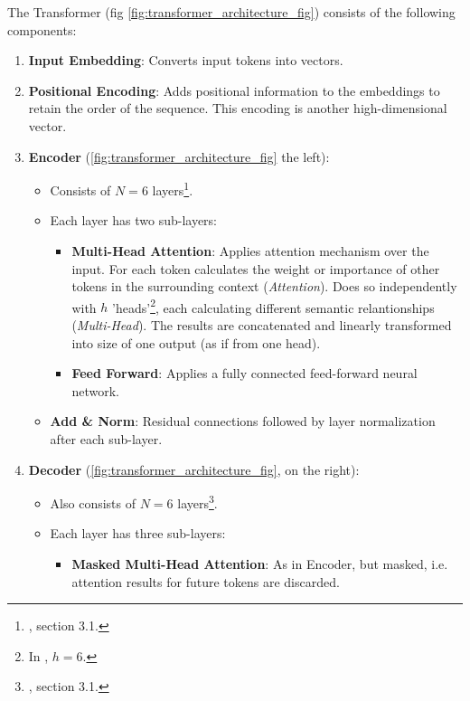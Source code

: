 The Transformer (fig \autoref{fig:transformer_architecture_fig}) consists of the following components:

\begin{enumerate}
	\item \textbf{Input Embedding}: Converts input tokens into vectors.
	\item \textbf{Positional Encoding}: Adds positional information to the embeddings to retain the order of the sequence. This encoding is another high-dimensional vector.
	\item \textbf{Encoder} (\autoref{fig:transformer_architecture_fig} the left):
	      \begin{itemize}
		      \item Consists of \(N = 6\) layers\footnote{\cite{attention_is_all_you_need}, section 3.1.}.
		      \item Each layer has two sub-layers:
		            \begin{itemize}
			            \item \textbf{Multi-Head Attention}: Applies attention mechanism over the input. For each token calculates the weight or importance of other tokens in the surrounding context (\textit{Attention}). Does so independently with \(h\) 'heads'\footnote{In \cite{attention_is_all_you_need}, \(h = 6\).}, each calculating different semantic relantionships (\textit{Multi-Head}). The results are concatenated and linearly transformed into size of one output (as if from one head).
			            \item \textbf{Feed Forward}: Applies a fully connected feed-forward neural network.
		            \end{itemize}
		      \item \textbf{Add \& Norm}: Residual connections followed by layer normalization after each sub-layer.
	      \end{itemize}
	\item \textbf{Decoder} (\autoref{fig:transformer_architecture_fig}, on the right):
	      \begin{itemize}
		      \item Also consists of \(N = 6\) layers\footnote{\cite{attention_is_all_you_need}, section 3.1.}.
		      \item Each layer has three sub-layers:
		            \begin{itemize}
			            \item \textbf{Masked Multi-Head Attention}: As in Encoder, but masked, i.e. attention results for future tokens are discarded.

\end{itemize}
\end{itemize}
\end{enumerate}

